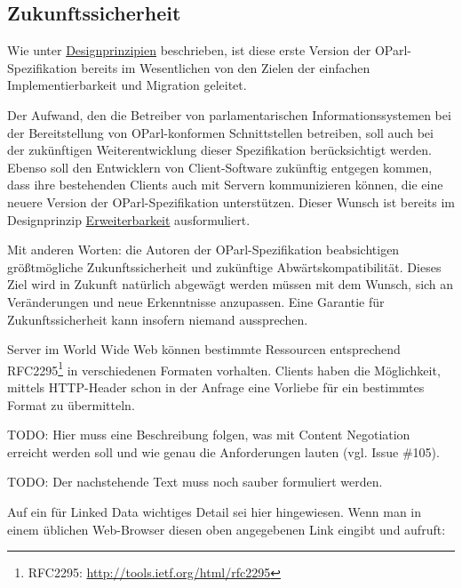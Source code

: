 \documentclass[,a4paper]{article}
\begin{document}
\subsection{Zukunftssicherheit}\label{zukunftssicherheit}

Wie unter \hyperref[designprinzipien]{Designprinzipien} beschrieben, ist
diese erste Version der OParl-Spezifikation bereits im Wesentlichen von
den Zielen der einfachen Implementierbarkeit und Migration geleitet.

Der Aufwand, den die Betreiber von parlamentarischen
Informationssystemen bei der Bereitstellung von OParl-konformen
Schnittstellen betreiben, soll auch bei der zukünftigen
Weiterentwicklung dieser Spezifikation berücksichtigt werden. Ebenso
soll den Entwicklern von Client-Software zukünftig entgegen kommen, dass
ihre bestehenden Clients auch mit Servern kommunizieren können, die eine
neuere Version der OParl-Spezifikation unterstützen. Dieser Wunsch ist
bereits im Designprinzip \hyperref[erweiterbarkeit]{Erweiterbarkeit}
ausformuliert.

Mit anderen Worten: die Autoren der OParl-Spezifikation beabsichtigen
größtmögliche Zukunftssicherheit und zukünftige Abwärtskompatibilität.
Dieses Ziel wird in Zukunft natürlich abgewägt werden müssen mit dem
Wunsch, sich an Veränderungen und neue Erkenntnisse anzupassen. Eine
Garantie für Zukunftssicherheit kann insofern niemand aussprechen.


Server im World Wide Web können bestimmte Ressourcen entsprechend
RFC2295\footnote{RFC2295: \url{http://tools.ietf.org/html/rfc2295}} in
verschiedenen Formaten vorhalten. Clients haben die Möglichkeit, mittels
HTTP-Header schon in der Anfrage eine Vorliebe für ein bestimmtes Format
zu übermitteln.

TODO: Hier muss eine Beschreibung folgen, was mit Content Negotiation
erreicht werden soll und wie genau die Anforderungen lauten (vgl. Issue
\#105).

TODO: Der nachstehende Text muss noch sauber formuliert werden.

Auf ein für Linked Data wichtiges Detail sei hier hingewiesen. Wenn man
in einem üblichen Web-Browser diesen oben angegebenen Link eingibt und
aufruft:
\end{document}
